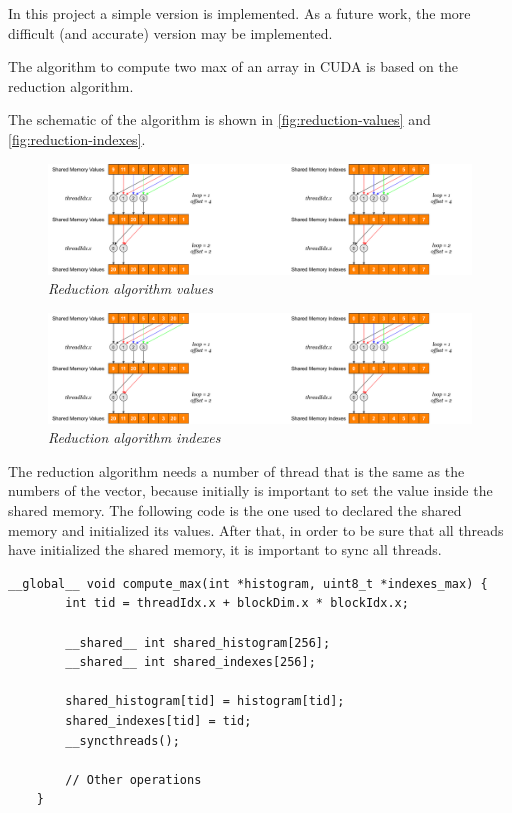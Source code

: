 \documentclass[paper=a4, fontsize=10pt]{scrartcl}	%
\begin{document}
	In this project a simple version is implemented. As a future work, the more difficult (and accurate) version may be implemented. 

	The algorithm to compute two max of an array in CUDA is based on the reduction algorithm.

	The schematic of the algorithm is shown in \autoref{fig:reduction-values} and \autoref{fig:reduction-indexes}.

	\begin{figure}[H]
		\centering
		\includegraphics[width=0.75\linewidth]{images/binarization/values.pdf}
		\caption{\textit{Reduction algorithm values}}
		\label{fig:reduction-values}
	\end{figure}

	\begin{figure}[H]
		\centering
		\includegraphics[width=0.75\linewidth]{images/binarization/indexes.pdf}
		\caption{\textit{Reduction algorithm indexes}}
		\label{fig:reduction-indexes}
	\end{figure}

	The reduction algorithm needs a number of thread that is the same as the numbers of the vector, because initially is important to set the value inside the shared memory. The following code is the one used to declared the shared memory and initialized its values. After that, in order to be sure that all threads have initialized the shared memory, it is important to sync all threads. 

	\begin{lstlisting}[style=CStyle]
	__global__ void compute_max(int *histogram, uint8_t *indexes_max) {
		int tid = threadIdx.x + blockDim.x * blockIdx.x;
	
		__shared__ int shared_histogram[256];
		__shared__ int shared_indexes[256];
	
		shared_histogram[tid] = histogram[tid];
		shared_indexes[tid] = tid;
		__syncthreads();

		// Other operations
	}
	\end{lstlisting}
\end{document}

